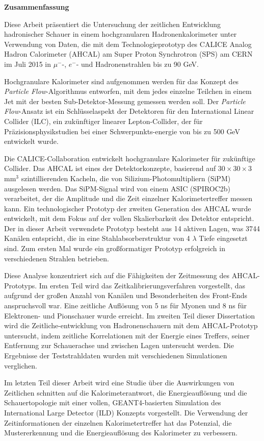 \newpage
\thispagestyle{empty}
\begin{center}
{\bf Zusammenfassung}
\end{center}

Diese Arbeit präsentiert die Untersuchung der zeitlichen Entwicklung hadronischer Schauer in einem hochgranularen Hadronenkalorimeter unter Verwendung von Daten, die mit dem Technologieprototyp des CALICE Analog Hadron Calorimeter (AHCAL) am Super Proton Synchrotron (SPS) am CERN im Juli 2015 in $\mu^-$-, $e^-$- und Hadronenstrahlen bis zu 90 GeV.

Hochgranulare Kalorimeter sind aufgenommen werden für das Konzept des \textit{Particle Flow}-Algorithmus entworfen, mit dem jedes einzelne Teilchen in einem Jet mit der besten Sub-Detektor-Messung gemessen werden soll. Der \textit{Particle Flow}-Ansatz ist ein Schlüsselaspekt der Detektoren für den International Linear Collider (ILC), ein zukünftiger linearer Lepton-Collider, der für Präzisionsphysikstudien bei einer Schwerpunkts-energie von bis zu 500 GeV entwickelt wurde.

Die CALICE-Collaboration entwickelt hochgranulare Kalorimeter für zukünftige Collider. Das AHCAL ist eines der Detektorkonzepte, basierend auf $30\times30\times3$ mm$^3$ szintillierenden Kacheln, die von Silizium-Photomultipliern (SiPM) ausgelesen werden. Das SiPM-Signal wird von einem ASIC (SPIROC2b) verarbeitet, der die Amplitude und die Zeit einzelner Kalorimetertreffer messen kann. Ein technologischer Prototyp der zweiten Generation des AHCAL wurde entwickelt, mit dem Fokus auf der vollen Skalierbarkeit des Detektor entspricht. Der in dieser Arbeit verwendete Prototyp besteht aus 14 aktiven Lagen, was 3744 Kanälen entspricht, die in eine Stahlabsorberstruktur von 4 $\lambda$ Tiefe eingesetzt sind. Zum ersten Mal wurde ein großformatiger Prototyp erfolgreich in verschiedenen Strahlen betrieben.

Diese Analyse konzentriert sich auf die Fähigkeiten der Zeitmessung des AHCAL-Prototyps. Im ersten Teil wird das Zeitkalibrierungsverfahren vorgestellt, das aufgrund der großen Anzahl von Kanälen und Besonderheiten des Front-Ends anspruchsvoll war. Eine zeitliche Auflösung von 5 ns für Myonen und 8 ns für Elektronen- und Pionschauer wurde erreicht. Im zweiten Teil dieser Dissertation wird die Zeitliche-ent\-wick\-lung von Hadronenschauern mit dem AHCAL-Prototyp untersucht, indem zeitliche Korrelationen mit der Energie eines Treffers, seiner Entfernung zur Schauerachse und zwischen Lagen untersucht werden. Die Ergebnisse der Teststrahldaten wurden mit verschiedenen Simulationen verglichen.

Im letzten Teil dieser Arbeit wird eine Studie über die Auswirkungen von Zeitlichen schnitten auf die Kalorimeterantwort, die Energieauflösung und die Schauertopologie mit einer vollen, GEANT4-basierten Simulation des International Large Detector (ILD) Konzepts vorgestellt. Die Verwendung der Zeitinformationen der einzelnen Kalorimetertreffer hat das Potenzial, die Mustererkennung und die Energieauflösung des Kalorimeter zu verbessern.

